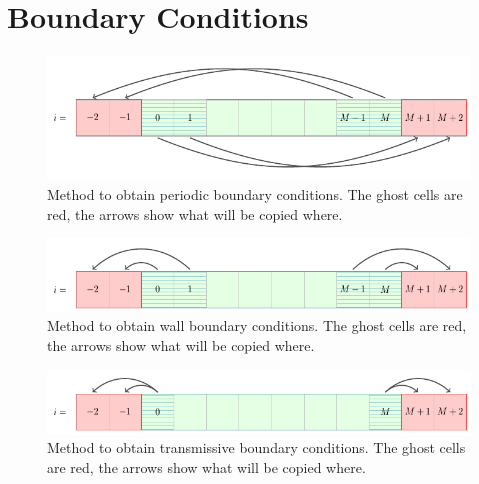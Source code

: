 \newpage
\section{Boundary Conditions}\label{chap:boundary-conditions}





\begin{figure}[htbp]
	\includegraphics[width=\textwidth]{./figures/tikz/boundary_periodic.pdf}%
	\caption{\label{fig:boundary_periodic}
		Method to obtain periodic boundary conditions.
		The ghost cells are red, the arrows show what will be copied where.
	}
\end{figure}



\begin{figure}[htbp]
	\includegraphics[width=\textwidth]{./figures/tikz/boundary_wall.pdf}%
	\caption{\label{fig:boundary_wall}
		Method to obtain wall boundary conditions.
		The ghost cells are red, the arrows show what will be copied where.
	}
\end{figure}



\begin{figure}[htbp]
	\includegraphics[width=\textwidth]{./figures/tikz/boundary_transmissive.pdf}%
	\caption{\label{fig:boundary_transmissive}
		Method to obtain transmissive boundary conditions.
		The ghost cells are red, the arrows show what will be copied where.
	}
\end{figure}



